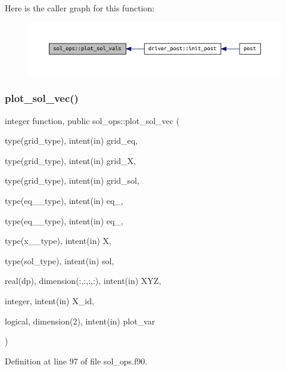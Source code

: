 Here is the caller graph for this function\+:
\nopagebreak
\begin{figure}[H]
\begin{center}
\leavevmode
\includegraphics[width=350pt]{namespacesol__ops_a0d4a798a56cfee9bced781d116852165_icgraph}
\end{center}
\end{figure}
\mbox{\label{namespacesol__ops_ae14af60a6f8f77e7dde1e93dbaa7e6d0}} 
\subsubsection{\texorpdfstring{plot\+\_\+sol\+\_\+vec()}{plot\_sol\_vec()}}
{\footnotesize\ttfamily integer function, public sol\+\_\+ops\+::plot\+\_\+sol\+\_\+vec (\begin{DoxyParamCaption}\item[{type(grid\+\_\+type), intent(in)}]{grid\+\_\+eq,  }\item[{type(grid\+\_\+type), intent(in)}]{grid\+\_\+X,  }\item[{type(grid\+\_\+type), intent(in)}]{grid\+\_\+sol,  }\item[{type(eq\+\_\+1\+\_\+type), intent(in)}]{eq\+\_,  }\item[{type(eq\+\_\+2\+\_\+type), intent(in)}]{eq\+\_,  }\item[{type(x\+\_\+1\+\_\+type), intent(in)}]{X,  }\item[{type(sol\+\_\+type), intent(in)}]{sol,  }\item[{real(dp), dimension(\+:,\+:,\+:,\+:), intent(in)}]{X\+YZ,  }\item[{integer, intent(in)}]{X\+\_\+id,  }\item[{logical, dimension(2), intent(in)}]{plot\+\_\+var }\end{DoxyParamCaption})}



Definition at line 97 of file sol\+\_\+ops.\+f90.

